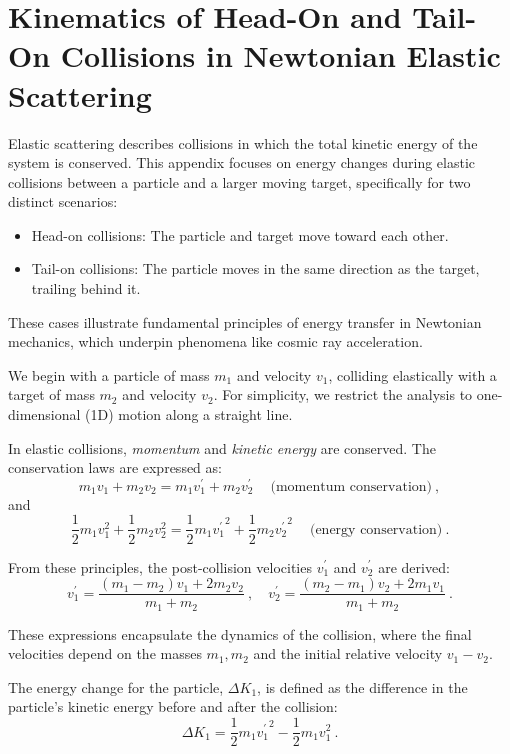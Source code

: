 \section{Kinematics of Head-On and Tail-On Collisions in Newtonian Elastic Scattering}

Elastic scattering describes collisions in which the total kinetic energy of the system is conserved. This appendix focuses on energy changes during elastic collisions between a particle and a larger moving target, specifically for two distinct scenarios:  
%
\begin{itemize}
\item Head-on collisions: The particle and target move toward each other.
\item Tail-on collisions: The particle moves in the same direction as the target, trailing behind it.  
\end{itemize}

These cases illustrate fundamental principles of energy transfer in Newtonian mechanics, which underpin phenomena like cosmic ray acceleration.

We begin with a particle of mass \( m_1 \) and velocity \( v_1 \), colliding elastically with a target of mass \( m_2 \) and velocity \( v_2 \). For simplicity, we restrict the analysis to one-dimensional (1D) motion along a straight line.  

In elastic collisions, \emph{momentum} and \emph{kinetic energy} are conserved. 
%
The conservation laws are expressed as:  
\[
m_1 v_1 + m_2 v_2 = m_1 v_1^\prime + m_2 v_2^\prime~\quad\text{(momentum conservation)}~,
\]  
and
\[
\frac{1}{2} m_1 v_1^2 + \frac{1}{2} m_2 v_2^2 = \frac{1}{2} m_1 {v_1^\prime}^2 + \frac{1}{2} m_2 {v_2^\prime}^2~\quad\text{(energy conservation)}~.
\]

From these principles, the post-collision velocities \( v_1^\prime \) and \( v_2^\prime \) are derived:  
\[
v_1^\prime = \frac{(m_1 - m_2)v_1 + 2 m_2 v_2}{m_1 + m_2}~, \quad v_2^\prime = \frac{(m_2 - m_1)v_2 + 2 m_1 v_1}{m_1 + m_2}~.
\]

These expressions encapsulate the dynamics of the collision, where the final velocities depend on the masses \( m_1, m_2 \) and the initial relative velocity \( v_1 - v_2 \).

The energy change for the particle, \( \Delta K_1 \), is defined as the difference in the particle's kinetic energy before and after the collision:  
\[
\Delta K_1 = \frac{1}{2} m_1 {v_1^\prime}^2 - \frac{1}{2} m_1 v_1^2~.
\]

